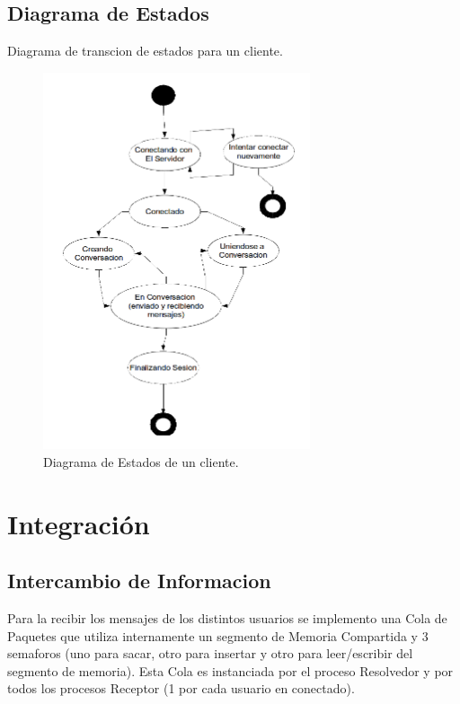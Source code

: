 \documentclass[a4paper,12pt,titlepage]{article}
\begin{document}
\subsection{Diagrama de Estados}
Diagrama de transcion de estados para un cliente.
\begin{figure}[h!]
\centering
\includegraphics[width=0.7\textwidth]{dia_estados_cliente.png}
\caption{Diagrama de Estados de un cliente.}
\label{fig:estados}
\end{figure}

\newpage
\section{Integración}
\subsection{Intercambio de Informacion}

Para la recibir los mensajes de los distintos usuarios se implemento una Cola de Paquetes que utiliza internamente un segmento de 
Memoria Compartida y 3 semaforos (uno para sacar, otro para insertar y otro para leer/escribir del segmento de memoria). Esta Cola es 
instanciada por el proceso Resolvedor y por todos los procesos Receptor (1 por cada usuario en conectado).\\
\end{document}
